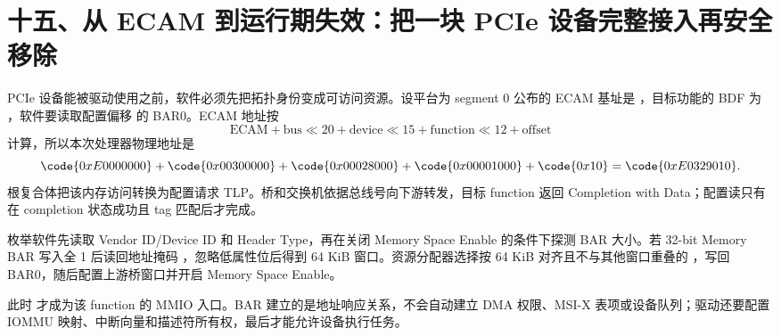 \section{十五、从 ECAM 到运行期失效：把一块 PCIe 设备完整接入再安全移除}

PCIe 设备能被驱动使用之前，软件必须先把拓扑身份变成可访问资源。设平台为 segment 0 公布的 ECAM 基址是 ，目标功能的 BDF 为 ，软件要读取配置偏移  的 BAR0。ECAM 地址按
\[
\mathrm{ECAM}+\mathrm{bus}\ll20+\mathrm{device}\ll15
+\mathrm{function}\ll12+\mathrm{offset}
\]
计算，所以本次处理器物理地址是
\[
\code{0xE0000000}+\code{0x00300000}+\code{0x00028000}
+\code{0x00001000}+\code{0x10}
=\code{0xE0329010}.
\]
根复合体把该内存访问转换为配置请求 TLP。桥和交换机依据总线号向下游转发，目标 function 返回 Completion with Data；配置读只有在 completion 状态成功且 tag 匹配后才完成。\cite{pcie-base}


枚举软件先读取 Vendor ID/Device ID 和 Header Type，再在关闭 Memory Space Enable 的条件下探测 BAR 大小。若 32-bit Memory BAR 写入全 1 后读回地址掩码 ，忽略低属性位后得到 64 KiB 窗口。资源分配器选择按 64 KiB 对齐且不与其他窗口重叠的 ，写回 BAR0，随后配置上游桥窗口并开启 Memory Space Enable。

此时  才成为该 function 的 MMIO 入口。BAR 建立的是地址响应关系，不会自动建立 DMA 权限、MSI-X 表项或设备队列；驱动还要配置 IOMMU 映射、中断向量和描述符所有权，最后才能允许设备执行任务。


